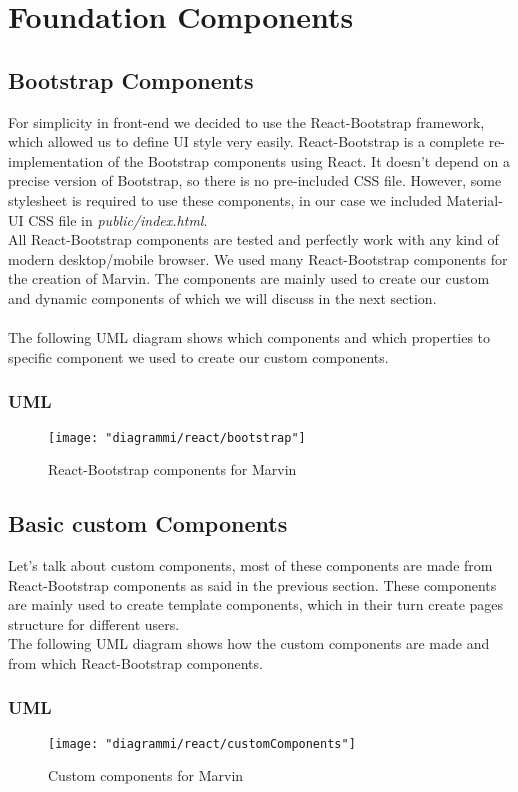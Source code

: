 \documentclass[../react.tex]{subfiles}
\begin{document}
	
	\section{Foundation Components}

	\subsection{Bootstrap Components} For simplicity in front-end we decided to use the React-Bootstrap framework, which allowed us to define UI style very easily. React-Bootstrap is a complete re-implementation of the Bootstrap components using React. It doesn't depend on a precise version of Bootstrap, so there is no pre-included CSS file. However, some stylesheet is required to use these components, in our case we included Material-UI CSS file in \textit{public/index.html}. \\ All React-Bootstrap components are tested and perfectly work with any kind of modern desktop/mobile browser. We used many React-Bootstrap components for the creation of Marvin. The components are mainly used to create our custom and dynamic components 
	of which we will discuss in the next section. \\ \\ The following UML diagram shows which components and which properties to specific component we used to create our custom components. 
		\subsubsection{UML}
		\begin{figure}[h]
			\centering
			\texttt{[image: "diagrammi/react/bootstrap"]}
			\caption{React-Bootstrap components for Marvin}
			\label{fig:React-Bootstrap components for Marvin}
		\end{figure}
	\newpage
	\subsection{Basic custom Components} Let's talk about custom components, most of these components are made from React-Bootstrap components as said in the previous section. These components are mainly used to create template components, which in their turn create pages structure for different users. \\The following UML diagram shows how the custom components are made and from which React-Bootstrap components.  
	\\ 
		\subsubsection{UML}
			\begin{figure}[h]
			\centering
			\texttt{[image: "diagrammi/react/customComponents"]}
			\caption{Custom components for Marvin}
			\label{fig:Custom components for Marvin}
		\end{figure}
\end{document}
